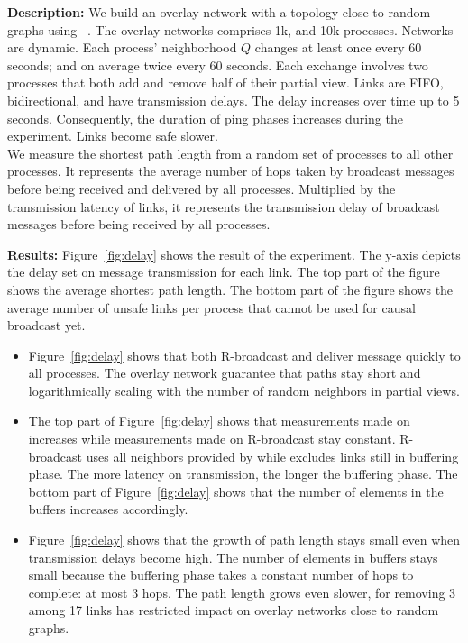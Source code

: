\noindent \textbf{Description:} We build an overlay network with a topology
close to random graphs using \SPRAY~\cite{nedelec2017adaptive}. The overlay
networks comprises 1k, and 10k processes. Networks are dynamic. Each process'
neighborhood $Q$ changes at least once every 60 seconds; and on average twice
every 60 seconds. Each exchange involves two processes that both add and remove
half of their partial view.  Links are FIFO, bidirectional, and have
transmission delays. The delay increases over time up to 5 seconds.
Consequently, the duration of ping phases increases during the experiment.
Links become safe slower. \\
We measure the shortest path length from a random set of processes to all other
processes. It represents the average number of hops taken by broadcast messages
before being received and delivered by all processes. Multiplied by the
transmission latency of links, it represents the transmission delay of broadcast
messages before being received by all processes.

\noindent \textbf{Results:} Figure~\ref{fig:delay} shows the result of the
experiment. The y-axis depicts the delay set on message transmission for each
link. The top part of the figure shows the average shortest path length. The
bottom part of the figure shows the average number of unsafe links per process
that cannot be used for causal broadcast yet.
\begin{itemize}[leftmargin=*]
\item Figure~\ref{fig:delay} shows that both R-broadcast and \CBROADCAST deliver
  message quickly to all processes. The overlay network guarantee that paths
  stay short and logarithmically scaling with the number of random neighbors in
  partial views.
\item The top part of Figure~\ref{fig:delay} shows that measurements made on
  \CBROADCAST increases while measurements made on R-broadcast stay
  constant. R-broadcast uses all neighbors provided by \SPRAY while \CBROADCAST
  excludes links still in buffering phase. The more latency on transmission, the
  longer the buffering phase. The bottom part of Figure~\ref{fig:delay} shows
  that the number of elements in the buffers increases accordingly.
\item Figure~\ref{fig:delay} shows that the growth of path length stays small
  even when transmission delays become high. The number of elements in buffers
  stays small because the buffering phase takes a constant number of hops to
  complete: at most 3 hops. The path length grows even slower, for removing 3
  among 17 links has restricted impact on overlay networks close to random
  graphs.
\end{itemize}

